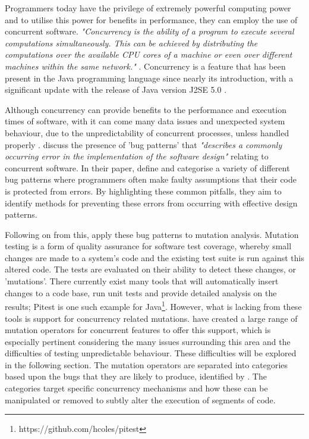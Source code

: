 \documentclass[a4paper,12pt]{article}
\begin{document}
Programmers today have the privilege of extremely powerful computing power and to utilise this power for benefits in performance, they can employ the use of concurrent software. \textit{"Concurrency is the ability of a program to execute several computations simultaneously. This can be achieved by distributing the computations over the available CPU cores of a machine or even over different machines within the same network."} \citep{mois15}. Concurrency is a feature that has been present in the Java programming language since nearly its introduction, with a significant update with the release of Java version J2SE 5.0 \citep{bradbury06}.  

Although concurrency can provide benefits to the performance and execution times of software, with it can come many data issues and unexpected system behaviour, due to the unpredictability of concurrent processes, unless handled properly \citep{mois15}. \citet{farchi03} discuss the presence of 'bug patterns' that \textit{"describes a commonly occurring error in the implementation of the software design"} relating to concurrent software. In their paper, \citet{farchi03} define and categorise a variety of different bug patterns where programmers often make faulty assumptions that their code is protected from errors. By highlighting these common pitfalls, they aim to identify methods for preventing these errors from occurring with effective design patterns.         

Following on from this, \citet{bradbury06} apply these bug patterns to mutation analysis. Mutation testing is a form of quality assurance for software test coverage, whereby small changes are made to a system's code and the existing test suite is run against this altered code. The tests are evaluated on their ability to detect these changes, or 'mutations'. There currently exist many tools that will automatically insert changes to a code base, run unit tests and provide detailed analysis on the results; Pitest is one such example for Java\footnote{https://github.com/hcoles/pitest}. However, what is lacking from these tools is support for concurrency related mutations. \citet{bradbury06} have created a large range of mutation operators for concurrent features to offer this support, which is especially pertinent considering the many issues surrounding this area and the difficulties of testing unpredictable behaviour. These difficulties will be explored in the following section. The mutation operators are separated into categories based upon the bugs that they are likely to produce, identified by \citet{farchi03}. The categories target specific concurrency mechanisms and how these can be manipulated or removed to subtly alter the execution of segments of code.
\end{document}
